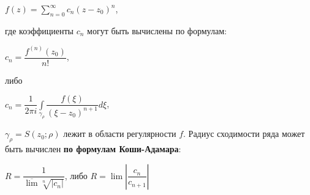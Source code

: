 \documentclass[a4paper, 12pt]{report}
\begin{document}
\begin{center}
    $f(z) = \sum_{n=0}^{\infty}c_n(z - z_0)^n$,
\end{center}

где коэффициенты $c_n$ могут быть вычислены по формулам:

\begin{center}
    $c_n = \dfrac{f^{(n)}(z_0)}{n!}$,
\end{center}

либо

\begin{center}
    $c_n = \dfrac{1}{2\pi i}\int\limits_{\gamma_{\rho}}\dfrac{f(\xi)}{(\xi - z_0)^{n+1}}d\xi$,
\end{center}

$\gamma_{\rho} = S(z_0; \rho)$ лежит в области регулярности $f$. Радиус сходимости ряда может быть вычислен \textbf{по формулам Коши-Адамара}:

\begin{center}
    $R = \dfrac{1}{\overline{\lim}\sqrt[n]{|c_n|}}$, либо $R = \lim|\dfrac{c_n}{c_{n+1}}|$
\end{center}
\end{document}
